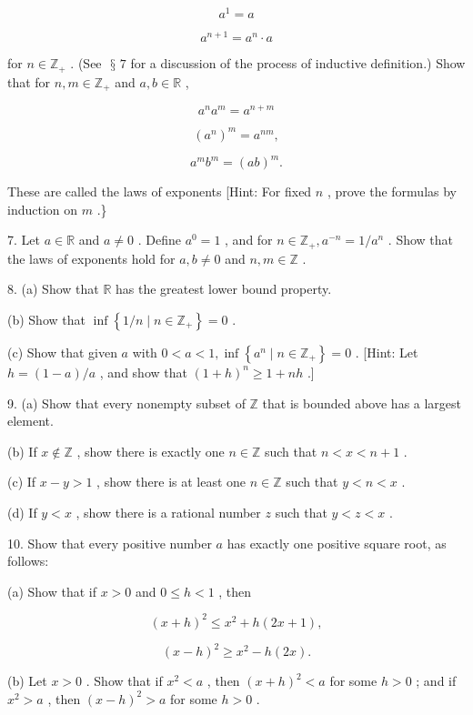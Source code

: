 \documentclass[10pt]{article}
\begin{document}
\[
{a}^{1} = a
\]

\[
{a}^{n + 1} = {a}^{n} \cdot  a
\]

for \(n \in  {\mathbb{Z}}_{ + }\) . (See \(\text{ § }7\) for a discussion of the process of inductive definition.) Show that for \(n,m \in  {\mathbb{Z}}_{ + }\) and \(a,b \in  \mathbb{R}\) ,

\[
{a}^{n}{a}^{m} = {a}^{n + m}
\]

\[
{\left( {a}^{n}\right) }^{m} = {a}^{nm},
\]

\[
{a}^{m}{b}^{m} = {\left( ab\right) }^{m}.
\]

These are called the laws of exponents [Hint: For fixed \(n\) , prove the formulas by induction on \(m\) .\}

7. Let \(a \in  \mathbb{R}\) and \(a \neq  0\) . Define \({a}^{0} = 1\) , and for \(n \in  {\mathbb{Z}}_{ + },{a}^{-n} = 1/{a}^{n}\) . Show that the laws of exponents hold for \(a,b \neq  0\) and \(n,m \in  \mathbb{Z}\) .

8. (a) Show that \(\mathbb{R}\) has the greatest lower bound property.

(b) Show that \(\inf \left\{  {1/n \mid  n \in  {\mathbb{Z}}_{ + }}\right\}   = 0\) .

(c) Show that given \(a\) with \(0 < a < 1,\inf \left\{  {{a}^{n} \mid  n \in  {\mathbb{Z}}_{ + }}\right\}   = 0\) . [Hint: Let \(h = \left( {1 - a}\right) /a\) , and show that \({\left( 1 + h\right) }^{n} \geq  1 + {nh}\) .]

9. (a) Show that every nonempty subset of \(\mathbb{Z}\) that is bounded above has a largest element.

(b) If \(x \notin  \mathbb{Z}\) , show there is exactly one \(n \in  \mathbb{Z}\) such that \(n < x < n + 1\) .

(c) If \(x - y > 1\) , show there is at least one \(n \in  \mathbb{Z}\) such that \(y < n < x\) .

(d) If \(y < x\) , show there is a rational number \(z\) such that \(y < z < x\) .

10. Show that every positive number \(a\) has exactly one positive square root, as follows:

(a) Show that if \(x > 0\) and \(0 \leq  h < 1\) , then

\[
{\left( x + h\right) }^{2} \leq  {x}^{2} + h\left( {{2x} + 1}\right) ,
\]

\[
{\left( x - h\right) }^{2} \geq  {x}^{2} - h\left( {2x}\right) .
\]

(b) Let \(x > 0\) . Show that if \({x}^{2} < a\) , then \({\left( x + h\right) }^{2} < a\) for some \(h > 0\) ; and if \({x}^{2} > a\) , then \({\left( x - h\right) }^{2} > a\) for some \(h > 0\) .
\end{document}
